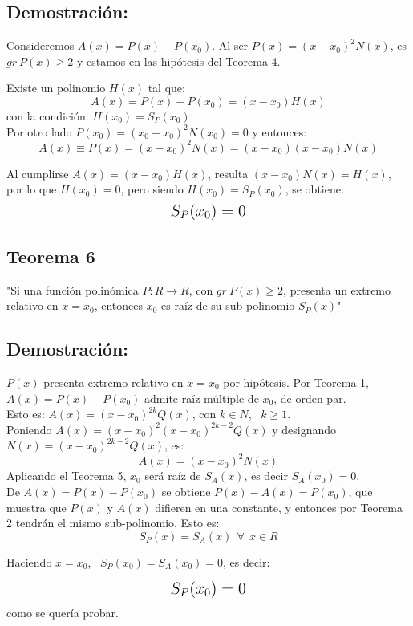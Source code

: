 \documentclass[12pt]{article}
\begin{document}
\subsection*{Demostración:}
Consideremos $A(x)=P(x)-P({x}_0)$. Al ser $P(x)=(x-{x}_0)^2 N(x)$, es $gr \ P(x) \geqslant 2$ y estamos en las hipótesis del Teorema 4. \\
\begin{center}
  Existe un polinomio $H(x)$ tal que:
  $$
    A(x)=P(x)-P({x}_0)=(x-{x}_0)H(x)
  $$
  con la condición: $H({x}_0)={S}_P({x}_0)$ \\
  Por otro lado $P({x}_0)=({x}_0-{x}_0)^2 N({x}_0)=0$ y entonces:
  $$
    A(x) \equiv P(x)=(x-{x}_0)^2 N(x)=(x-{x}_0)(x-{x}_0)N(x)
  $$
\end{center}
Al cumplirse $A(x)=(x-{x}_0)H(x)$, resulta $(x-{x}_0)N(x)=H(x)$, por lo que $H({x}_0)=0$, pero siendo $H({x}_0)={S}_P ({x}_0)$, se obtiene:
$$
  \text{\Large{${S}_P({x}_0)=0$}}
$$

\subsection{
  Teorema 6
}
"Si una función polinómica $P:R \rightarrow R$, con $gr \ P(x) \geqslant 2$, presenta un extremo relativo en $x={x}_0$, entonces ${x}_0$ es raíz de su sub-polinomio ${S}_P(x)$"

\subsection*{Demostración:}
$P(x)$ presenta extremo relativo en $x={x}_0$ por hipótesis. Por Teorema 1, $A(x)=P(x)-P({x}_0)$ admite raíz múltiple de ${x}_0$, de orden par. \\
Esto es: $A(x)=(x-{x}_0)^{2k}Q(x)$, con $k \in N $, \ $k \geqslant 1$. \\
Poniendo $A(x)=(x-{x}_0)^2(x-{x}_0)^{2k-2}Q(x)$ y designando $N(x)=(x-{x}_0)^{2k-2}Q(x)$, es:
$$
  A(x)=(x-{x}_0)^2 N(x)
$$
Aplicando el Teorema 5, ${x}_0$ será raíz de ${S}_A(x)$, es decir ${S}_A({x}_0)=0$. \\
De $A(x)=P(x)-P({x}_0)$ se obtiene $P(x)-A(x)=P({x}_0)$, que muestra que $P(x)$ y $A(x)$ difieren en una constante, y entonces por Teorema 2 tendrán el mismo sub-polinomio. Esto es:
$$
  {S}_P(x)={S}_A(x) \ \ \forall \ \ x \in R
$$
\begin{center}
  Haciendo $x={x}_0$, \ ${S}_P({x}_0)={S}_A({x}_0)=0$, es decir:
\end{center}
$$
  \text{\Large{${S}_P({x}_0)=0$}}
$$
como se quería probar.
\clearpage
\end{document}
